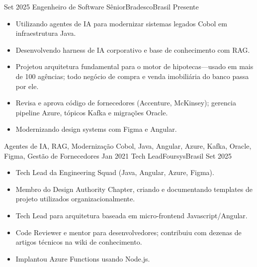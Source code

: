 %
%
%
\begin{experiences}
  \experience
    {Set 2025}   {Engenheiro de Software Sênior}{Bradesco}{Brasil}
    {Presente} {
                      \begin{itemize}
                        \item Utilizando agentes de IA para modernizar sistemas legados Cobol em infraestrutura Java.
                        \item Desenvolvendo harness de IA corporativo e base de conhecimento com RAG.
                        \item Projetou arquitetura fundamental para o motor de hipotecas—usado em mais de 100 agências; todo negócio de compra e venda imobiliária do banco passa por ele.
                        \item Revisa e aprova código de fornecedores (Accenture, McKinsey); gerencia pipeline Azure, tópicos Kafka e migrações Oracle.
                        \item Modernizando design systems com Figma e Angular.
                      \end{itemize}
                    }
                    {Agentes de IA, RAG, Modernização Cobol, Java, Angular, Azure, Kafka, Oracle, Figma, Gestão de Fornecedores}
  \emptySeparator
  \experience
    {Jan 2021}   {Tech Lead}{Foursys}{Brasil}
    {Set 2025} {
                      \begin{itemize}
                        \item Tech Lead da Engineering Squad (Java, Angular, Azure, Figma).
                        \item Membro do Design Authority Chapter, criando e documentando templates de projeto utilizados organizacionalmente.
                        \item Tech Lead para arquitetura baseada em micro-frontend Javascript/Angular.
                        \item Code Reviewer e mentor para desenvolvedores; contribuiu com dezenas de artigos técnicos na wiki de conhecimento.
                        \item Implantou Azure Functions usando Node.js.
                      \end{itemize}
}
\end{experiences}
